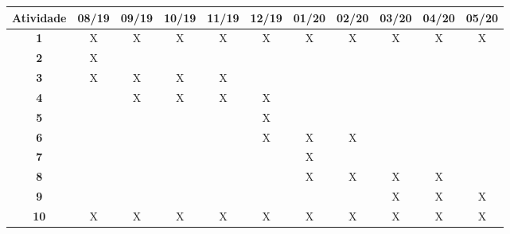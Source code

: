     \begin{table}[h]
    \scriptsize
        \begin{tabular}{|c|c|c|c|c|c|c|c|c|c|c|}
\hline
\textbf{Atividade} & \textbf{08/19} & \textbf{09/19} & \textbf{10/19} & \textbf{11/19} & \textbf{12/19} & \textbf{01/20} & \textbf{02/20} & \textbf{03/20} & \textbf{04/20} & \textbf{05/20} \\ \hline
\textbf{1}         & X              & X              & X              & X              & X              & X              & X              & X              & X              & X              \\ \hline
\textbf{2}         & X              &                &                &                &                &                &                &                &                &                \\ \hline
\textbf{3}         & X              & X              & X              & X              &                &                &                &                &                &                \\ \hline
\textbf{4}         &                & X              & X              & X              & X              &                &                &                &                &                \\ \hline
\textbf{5}         &                &                &                &                & X              &                &                &                &                &                \\ \hline
\textbf{6}         &                &                &                &                & X              & X              & X              &                &                &                \\ \hline
\textbf{7}         &                &                &                &                &                & X              &                &                &                &                \\ \hline
\textbf{8}         &                &                &                &                &                & X              & X              & X              & X              &                \\ \hline
\textbf{9}         &                &                &                &                &                &                &                & X              & X              & X              \\ \hline
\textbf{10}        & X              & X              & X              & X              & X              & X              & X              & X              & X              & X              \\ \hline
\end{tabular}
\end{table}

